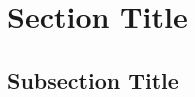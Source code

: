 \documentclass[11pt,letterpaper]{article}
\begin{document}
\section{Section Title}

\subsection{Subsection Title}
\end{document}
